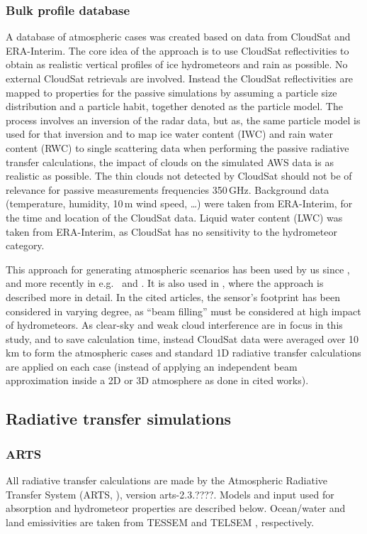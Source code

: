 \documentclass[12pt]{article}
\begin{document}
\subsubsection{Bulk profile database}
%
A database of atmospheric cases was created based on data from CloudSat and
ERA-Interim. The core idea of the approach is to use CloudSat reflectivities to
obtain as realistic vertical profiles of ice hydrometeors and rain as
possible. No external CloudSat retrievals are involved. Instead the CloudSat
reflectivities are mapped to properties for the passive simulations by assuming
a particle size distribution and a particle habit, together denoted as
the particle model. The process involves an inversion of the radar data, but as,
the same particle model is used for that inversion and to map ice water content
(IWC) and rain water content (RWC) to single scattering data when performing
the passive radiative transfer calculations, the impact of clouds on the
simulated AWS data is as realistic as possible. The thin clouds not detected by
CloudSat should not be of relevance for passive measurements frequencies
350\,GHz. Background data (temperature, humidity, 10\,m wind speed, \dots) were
taken from ERA-Interim, for the time and location of the CloudSat data. Liquid
water content (LWC) was taken from ERA-Interim, as CloudSat has no sensitivity
to the hydrometeor category.

This approach for generating atmospheric scenarios has been used by us since
\citet{rydberg:nonga:09}, and more recently in e.g.\
\citet{eriksson:towar:20} and \citet{barlakas:three:20}. It is also used in
\citet{ekelund:using:20}, where the approach is described more in detail. In
the cited articles, the sensor's footprint has been considered in varying
degree, as ``beam filling'' must be considered at high impact of hydrometeors.
As clear-sky and weak cloud interference are in focus in this study, and to
save calculation time, instead CloudSat data were averaged over 10\,km to form
the atmospheric cases and standard 1D radiative transfer calculations are
applied on each case (instead of applying an independent beam approximation
inside a 2D or 3D atmosphere as done in cited works).



\subsection{Radiative transfer simulations}
%
\subsubsection{ARTS}
%
All radiative transfer calculations are made by the Atmospheric Radiative
Transfer System (ARTS, \citet{eriksson:arts2:11,buehler:artst:18}), version
arts-2.3.????. Models and input used for absorption and hydrometeor properties
are described below. Ocean/water and land emissivities are taken from
TESSEM \citep{prigent2017sea} and TELSEM \citep{aires2011tool}, respectively.
\end{document}
